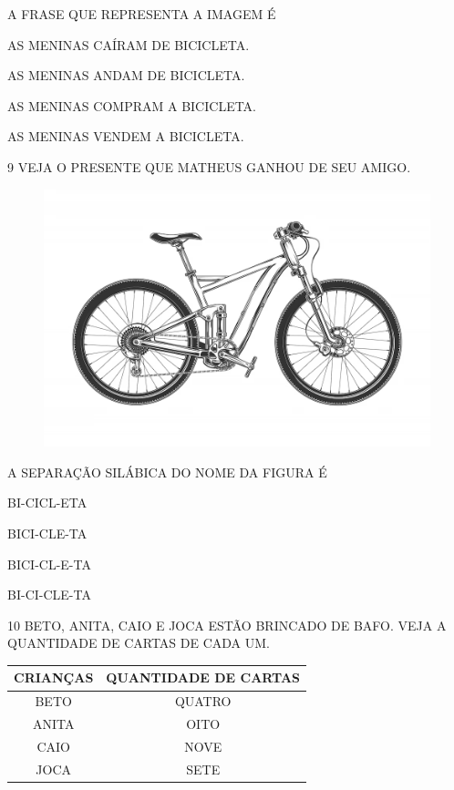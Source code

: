 A FRASE QUE REPRESENTA A IMAGEM É

\begin{escolha}

\item AS MENINAS CAÍRAM DE BICICLETA.

\item AS MENINAS ANDAM DE BICICLETA.

\item AS MENINAS COMPRAM A BICICLETA.

\item AS MENINAS VENDEM A BICICLETA.

\end{escolha}

\num{9} VEJA O PRESENTE QUE MATHEUS GANHOU DE SEU AMIGO.

\begin{figure}[H]
\centering
\includegraphics[width=.8\textwidth]{./media/image242.png}
\end{figure}

A SEPARAÇÃO SILÁBICA DO NOME DA FIGURA É

\begin{escolha}

\item BI-CICL-ETA

\item BICI-CLE-TA

\item BICI-CL-E-TA

\item BI-CI-CLE-TA

\end{escolha}

\num{10} BETO, ANITA, CAIO E JOCA ESTÃO BRINCADO DE BAFO.
VEJA A QUANTIDADE DE CARTAS DE CADA UM.

\begin{table}[H]
\centering
\begin{tabular}{|c|c|}
\hline
\textbf{CRIANÇAS} & \textbf{QUANTIDADE DE CARTAS} \\ \hline
BETO              & QUATRO                        \\ \hline
ANITA             & OITO                          \\ \hline
CAIO              & NOVE                          \\ \hline
JOCA              & SETE                          \\ \hline
\end{tabular}
\end{table}

